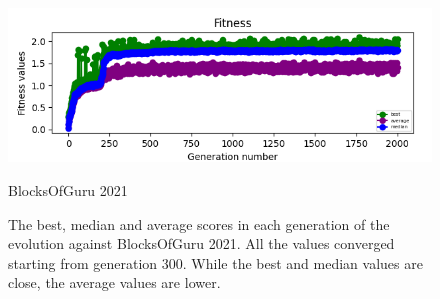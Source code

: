 \documentclass[dvipsnames, format=sigconf]{acmart}
\begin{document}
\begin{figure}
    \includegraphics[width=\linewidth]{images/blocksofguru_hist_clipped.png}\vspace{-0.3cm}
    \caption{BlocksOfGuru 2021}\vspace{-0.4cm}
    \label{fig:hist1}
    \caption{The best, median and average scores in each generation of the evolution against BlocksOfGuru 2021. All the values converged starting from generation 300. While the best and median values are close, the average values are lower. \vspace{-0.8cm}}
\end{figure}

\end{document}
